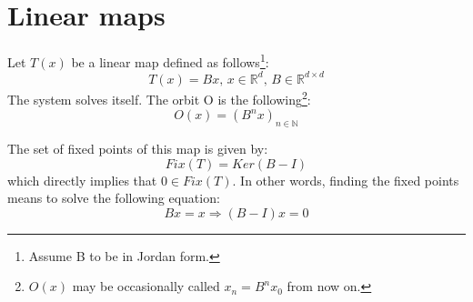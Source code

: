\section{Linear maps}
Let $T(x)$ be a linear map defined as follows\footnote{Assume B to be in Jordan form.}: \begin{equation}
    T(x)=Bx,\, x\in\mathbb{R}^d,\, B\in\mathbb{R}^{d\times d}
    \label{eq:lin_map}
\end{equation}
The system solves itself. The orbit O is the following\footnote{$O(x)$ may be occasionally called $x_n=B^{n}x_0$ from now on.}:
\begin{equation*}
    O(x)=(B^nx)_{n\in\mathbb{N}}
\end{equation*}

The set of fixed points of this map is given by: \begin{equation*}
    Fix(T)=Ker(B-I)
\end{equation*}
which directly implies that $0\in Fix(T)$.
In other words, finding the fixed points means to solve the following equation:
\begin{equation*}
    Bx=x \Rightarrow (B-I)x=0
\end{equation*}

